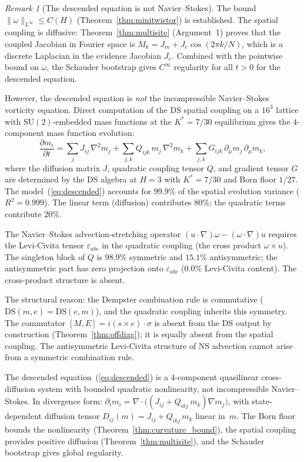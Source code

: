 \documentclass[11pt,a4paper]{article}
\theoremstyle{definition}
\theoremstyle{remark}
\newtheorem{remark}[theorem]{Remark}
\newcommand{\SU}{\mathrm{SU}}
\begin{document}
\begin{remark}[The descended equation is not Navier--Stokes]\label{rem:ns_gap}
The bound $\|\omega\|_{L^\infty}\leq C(H)$ (Theorem~\ref{thm:minitwistor}) is established. The spatial coupling is diffusive: Theorem~\ref{thm:multisite} (Argument~1) proves that the coupled Jacobian in Fourier space is $M_k=J_m+J_e\cos(2\pi k/N)$, which is a discrete Laplacian in the evidence Jacobian $J_e$. Combined with the pointwise bound on $\omega$, the Schauder bootstrap gives $C^\infty$ regularity for all $t>0$ for the descended equation.

However, the descended equation is \emph{not} the incompressible Navier--Stokes vorticity equation. Direct computation of the DS spatial coupling on a $16^3$ lattice with $\SU(2)$-embedded mass functions at the $K^*=7/30$ equilibrium gives the $4$-component mass function evolution:
\begin{equation}\label{eq:descended}
\frac{\partial m_i}{\partial t}=\sum_j J_{ij}\,\nabla^2 m_j+\sum_{j,k}Q_{ijk}\,m_j\,\nabla^2 m_k+\sum_{j,k}G_{ijk}\,\partial_\mu m_j\,\partial_\mu m_k,
\end{equation}
where the diffusion matrix $J$, quadratic coupling tensor $Q$, and gradient tensor $G$ are determined by the DS algebra at $H=3$ with $K^*=7/30$ and Born floor $1/27$. The model~(\ref{eq:descended}) accounts for $99.9\%$ of the spatial evolution variance ($R^2=0.999$). The linear term (diffusion) contributes $80\%$; the quadratic terms contribute $20\%$.

The Navier--Stokes advection-stretching operator $(u\cdot\nabla)\omega-(\omega\cdot\nabla)u$ requires the Levi-Civita tensor $\varepsilon_{abc}$ in the quadratic coupling (the cross product $\omega\times u$). The singleton block of $Q$ is $98.9\%$ symmetric and $15.1\%$ antisymmetric; the antisymmetric part has zero projection onto $\varepsilon_{abc}$ ($0.0\%$ Levi-Civita content). The cross-product structure is absent.

The structural reason: the Dempster combination rule is commutative ($\mathrm{DS}(m,e)=\mathrm{DS}(e,m)$), and the quadratic coupling inherits this symmetry. The commutator $[M,E]=i(s\times e)\cdot\sigma$ is absent from the DS output by construction (Theorem~\ref{thm:offdiag}); it is equally absent from the spatial coupling. The antisymmetric Levi-Civita structure of NS advection cannot arise from a symmetric combination rule.

The descended equation~(\ref{eq:descended}) is a $4$-component quasilinear cross-diffusion system with bounded quadratic nonlinearity, not incompressible Navier--Stokes. In divergence form: $\partial_t m_i=\nabla\cdot\bigl((J_{ij}+Q_{ikj}\,m_k)\nabla m_j\bigr)$, with state-dependent diffusion tensor $D_{ij}(m)=J_{ij}+Q_{ikj}\,m_k$ linear in~$m$. The Born floor bounds the nonlinearity (Theorem~\ref{thm:curvature_bound}), the spatial coupling provides positive diffusion (Theorem~\ref{thm:multisite}), and the Schauder bootstrap gives global regularity.


\end{remark}
\end{document}
